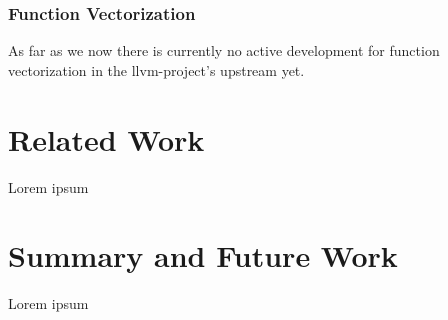 \documentclass[sigplan,11pt,nonacm]{acmart}
\begin{document}
\subsubsection{Function Vectorization}
As far as we now there is currently no active development for function vectorization in the
llvm-project's upstream yet.




\section{Related Work}
\label{sec:relatedwork}
Lorem ipsum




\section{Summary and Future Work}
\label{sec:summary}
Lorem ipsum




\end{document}
